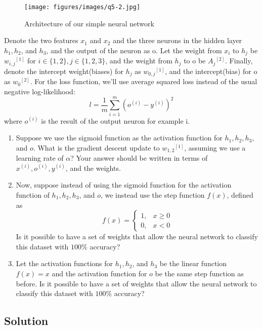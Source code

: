 \begin{figure}[htb]
    \centering
    \texttt{[image: figures/images/q5-2.jpg]}
    \caption{
        Architecture of our simple neural network
    }\label{fig:q5-2}
\end{figure}
Denote the two features \( x_{1} \) and \( x_{2} \) and the three neurons in the hidden layer \( h_{1}, h_{2} \), and \( h_{3} \), and the output of the neuron as o.
Let the weight from \( x_{i} \) to \( h_{j} \) be \( w_{i, j}{ }^{[1]} \) for \( i \in \{1,2\}, j \in \{1,2,3\} \), and the weight from \( h_{j} \) to o be \( A_{j}{ }^{[2]} \).
Finally, denote the intercept weight(biases) for \( h_{j} \) as \( w_{0, j}{ }^{[1]} \), and the intercept(bias) for o as \( w_{0}{ }^{[2]} \).
For the loss function, we'll use average squared loss instead of the usual negative log-likelihood:
\[
    l=\frac{1}{m} \sum_{i=1}^{m}\left(o^{(i)}-y^{(i)}\right)^{2}
\]
where \( o^{(i)} \) is the result of the output neuron for example i.
\begin{enumerate}[label= (\alph*), noitemsep, topsep=0pt]
    \item Suppose we use the sigmoid function as the activation function for \( h_{1}, h_{2}, h_{3} \), and \( o \).
          What is the gradient descent update to \( w_{1,2}{ }^{[1]} \), assuming we use a learning rate of \( \alpha \)?
          Your answer should be written in terms of \( x^{(i)}, o^{(i)}, y^{(i)} \), and the weights.

    \item Now, suppose instead of using the sigmoid function for the activation function of \( h_{1}, h_{2}, h_{3} \), and \( o \), we instead use the step function \( f(x) \), defined as
          \[
              f(x)= \begin{cases}1, & x \geq 0 \\ 0, & x<0\end{cases}
          \]
          Is it possible to have a set of weights that allow the neural network to classify this dataset with \( 100 \% \) accuracy?

    \item Let the activation functions for \( h_{1}, h_{2} \), and \( h_{3} \) be the linear function \( f(x)=x \) and the activation function for \( o \) be the same step function as before.
          Is it possible to have a set of weights that allow the neural network to classify this dataset with \( 100 \% \) accuracy?
\end{enumerate}

\subsection*{Solution}
